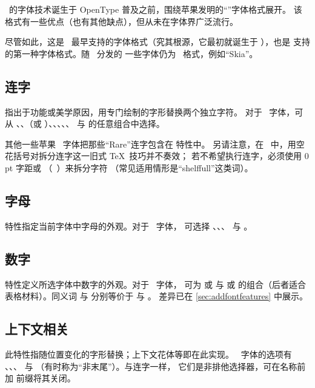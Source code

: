\documentclass[a4paper]{l3doc}
\begin{document}
\MacOSX\ 的字体技术诞生于 OpenType 普及之前，围绕苹果发明的“\AAT”字体格式展开。
该格式有一些优点（也有其他缺点），但从未在字体界广泛流行。

尽管如此，这是 \XeTeX\ 最早支持的字体格式（究其根源，它最初就诞生于
\MacOSX），也是  支持的第一种字体格式。随 \MacOSX\ 分发的
一些字体仍为 \AAT\ 格式，例如“Skia”。

\subsection{连字}

 指出于功能或美学原因，用专门绘制的字形替换两个独立字符。
对于 \AAT\ 字体，可从 、、（或
）、、、、、
 与  的任意组合中选择。

其他一些苹果 \AAT\ 字体把那些“Rare”连字包含在  特性中。
另请注意，在 \XeTeX\ 中，用空花括号对拆分连字这一旧式 \TeX\ 技巧并不奏效；
若不希望执行连字，必须使用 0\,pt 字距或 （\eg\ ）来拆分字符
（常见适用情形是“shelf\null full”这类词）。

\subsection{字母} \label{sec:aat-letters}
 特性指定当前字体中字母的外观。对于 \AAT\ 字体，
可选择 、、、 与
。


\subsection{数字}
 特性定义所选字体中数字的外观。对于 \AAT\ 字体，
可为  或  与  或
 的组合（后者适合表格材料）。同义词  与
 分别等价于  与 。
差异已在 \vref{sec:addfontfeatures} 中展示。

\subsection{上下文相关} \label{sec:contextuals}
此特性指随位置变化的字形替换；上下文花体等即在此实现。
\AAT\ 字体的选项有 、、、
 与 （有时称为“非末尾”）。与连字一样，
它们是非排他选择器，可在名称前加  前缀将其关闭。
\end{document}

